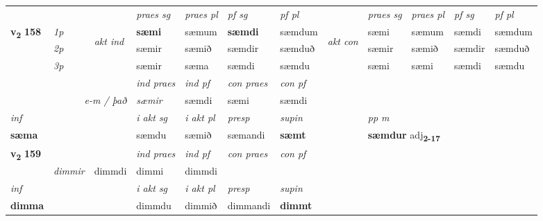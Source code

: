 \begin{longtable}[l]{X>{\footnotesize\itshape}llXXXXlXXXX}
 & &   & \textit{praes sg}  & \textit{praes pl}    & \textit{ pf sg} & \textit{pf pl} & & \textit{praes sg}  & \textit{praes pl}    & \textit{pf sg} & \textit{pf pl }  \\ \cmidrule{4-7} \cmidrule{9-12}
 \multirow{2}{*}{{{\textbf{v{\textsubscript{2}}} \Large{\textbf{158}}}}}  & 1p & \multirow{3}{*}{\begin{turn}{90}\textit{akt ind}\end{turn}} & \textbf{sæmi} & sæmum & \textbf{sæmdi} & sæmdum & \multirow{3}{*}{\begin{turn}{90}\textit{akt con}\end{turn}} &sæmi & sæmum & sæmdi & sæmdum\\*
 & 2p &  &  sæmir  & sæmið & sæmdir & sæmduð & & sæmir & sæmið & sæmdir & sæmduð \\*
 & 3p &  & sæmir & sæma & sæmdi & sæmdu & & sæmi & sæmi& sæmdi & sæmdu \\*
\cmidrule{4-7} \cmidrule{9-12}

   && &  \textit{ind praes} & \textit{ind pf} & \textit{con praes} & \textit{con pf} \\*
\multicolumn{3}{r}{\textit{e-m / það}} & sæmir & sæmdi & sæmi & sæmdi \\*

\cmidrule{4-7}
   {\textit{inf}} & &  & \textit{i akt sg} & \textit{i akt pl}   & \textit{presp} & \textit{supin}  && \textit{pp m} \\*
  {\textbf{sæma}} & && sæmdu  & sæmið   & sæmandi &  \textbf{sæmt}  && \multicolumn{2}{l}{\textbf{sæmdur} adj\textbf{\textsubscript{2-17}}} \\*

\midrule

\multirow{2}{*}{{{\textbf{v{\textsubscript{2}}} \Large{\textbf{159}}}}}  &&&  \textit{ind praes} & \textit{ind pf} & \textit{con praes} & \textit{con pf} \\*
\multicolumn{3}{r}{\textit{e-m / það}} & dimmir & dimmdi & dimmi & dimmdi \\*

\cmidrule{4-7}
   {\textit{inf}} & &  & \textit{i akt sg} & \textit{i akt pl}   & \textit{presp} & \textit{supin}   \\*
  {\textbf{dimma}} & && dimmdu  & dimmið   & dimmandi &  \textbf{dimmt}   \\*

\midrule


\end{longtable}
